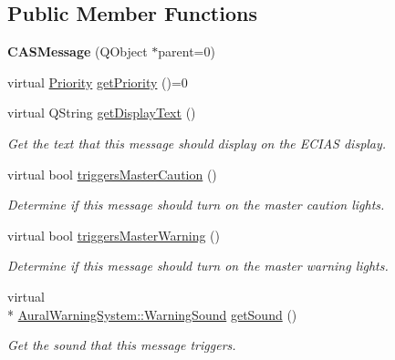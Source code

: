\subsection*{Public Member Functions}
\begin{DoxyCompactItemize}
\item 
\hypertarget{class_challenger604_systems_1_1_c_a_s_1_1_c_a_s_message_a67f3029962225598a323c961c19025d7}{{\bfseries C\-A\-S\-Message} (Q\-Object $\ast$parent=0)}\label{class_challenger604_systems_1_1_c_a_s_1_1_c_a_s_message_a67f3029962225598a323c961c19025d7}

\item 
virtual \hyperlink{class_challenger604_systems_1_1_c_a_s_1_1_c_a_s_message_a5a503c8cb9618403fcd342dca9ba1ca9}{Priority} \hyperlink{class_challenger604_systems_1_1_c_a_s_1_1_c_a_s_message_a36d3794a82ae29fa029494e341a83127}{get\-Priority} ()=0
\item 
virtual Q\-String \hyperlink{class_challenger604_systems_1_1_c_a_s_1_1_c_a_s_message_a28c4a2be2b31dcc8183ea84effe8f81c}{get\-Display\-Text} ()
\begin{DoxyCompactList}\small\item\em Get the text that this message should display on the E\-C\-I\-A\-S display. \end{DoxyCompactList}\item 
virtual bool \hyperlink{class_challenger604_systems_1_1_c_a_s_1_1_c_a_s_message_a55b6926bfd7af2af340cd075e5fb8a17}{triggers\-Master\-Caution} ()
\begin{DoxyCompactList}\small\item\em Determine if this message should turn on the master caution lights. \end{DoxyCompactList}\item 
virtual bool \hyperlink{class_challenger604_systems_1_1_c_a_s_1_1_c_a_s_message_a6296584e1a8eff970892c65ce66e8111}{triggers\-Master\-Warning} ()
\begin{DoxyCompactList}\small\item\em Determine if this message should turn on the master warning lights. \end{DoxyCompactList}\item 
virtual \\*
\hyperlink{class_challenger604_systems_1_1_aural_warning_system_a06a8a8fa973dde5ad449b8e0ca058a26}{Aural\-Warning\-System\-::\-Warning\-Sound} \hyperlink{class_challenger604_systems_1_1_c_a_s_1_1_c_a_s_message_af28c41e0c3f36a915bc9151318465b78}{get\-Sound} ()
\begin{DoxyCompactList}\small\item\em Get the sound that this message triggers. \end{DoxyCompactList}\end{DoxyCompactItemize}


